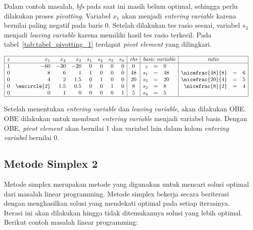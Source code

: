 Dalam contoh masalah, \textit{bfs} pada saat ini masih belum optimal, sehingga perlu dilakukan proses \textit{pivotting}. Variabel \(x_1\) akan menjadi \textit{entering variable} karena bernilai paling negatif pada baris 0. Setelah dilakukan tes rasio sesuai, variabel \(s_3\) menjadi \textit{leaving variable} karena memiliki hasil tes rasio terkecil. Pada tabel~\ref{tab:tabel_pivotting_1} terdapat \textit{pivot element} yang dilingkari.

\begin{center}
	\label{tab:tabel_pivotting_1}
	$
	\begin{array}{|r r r r r r r r|c|r c l|r c l|}
		\hline
		z & x_1 & x_2 & x_3 & s_1 & s_2 & s_3 & s_4 & \textit{rhs} & \multicolumn{3}{c|}{\textit{basic variable}} & \multicolumn{3}{c|}{\textit{ratio}}\\
		\hline
		1 & -60 & -30 & -20 & 0 & 0 & 0 & 0 & 0 & z & = & 0 &&&\\
		0 & 8 & 6 & 1 & 1 & 0 & 0 & 0 & 48 & s_1 & = & 48 & \nicefrac{48}{8} & = & 6\\
		0 & 4 & 2 & 1.5 & 0 & 1 & 0 & 0 & 20 & s_2 & = & 20 & \nicefrac{20}{4} & = & 5\\
		0 & \encircle{2} & 1.5 & 0.5 & 0 & 0 & 1 & 0 & 8 & s_3 & = & 8 & \nicefrac{8}{2} & = & 4\\
		0 & 0 & 1 & 0 & 0 & 0 & 0 & 1 & 5 & s_4 & = & 5 &&&\\
		\hline
	\end{array}
	$
\end{center}

Setelah menentukan \textit{entering variable} dan \textit{leaving variable}, akan dilakukan OBE. OBE dilakukan untuk membuat \textit{entering variable} menjadi variabel basis. Dengan OBE, \textit{pivot element} akan bernilai 1 dan variabel lain dalam kolom \textit{entering variabel} bernilai 0.

\subsection{Metode Simplex 2}

Metode simplex merupakan metode yang digunakan untuk mencari solusi optimal dari masalah linear programming. Metode simplex bekerja secara beriterasi dengan menghasilkan solusi yang mendekati optimal pada setiap iterasinya. Iterasi ini akan dilakukan hingga tidak ditemukannya solusi yang lebih optimal. Berikut contoh masalah linear programming:

